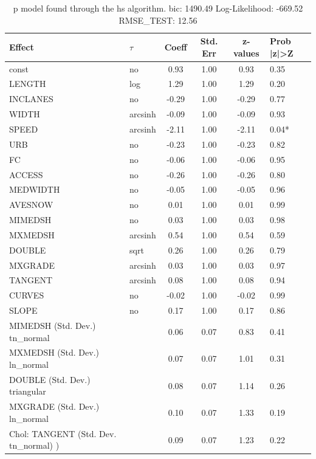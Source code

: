 \begin{table}
	\caption{p model found through the hs algorithm. bic: 1490.49 Log-Likelihood: -669.52 RMSE_TEST: 12.56}
	\begin{center}
		\begin{tabular}{|l|l|c|c|c|l|}
			\hline
			Effect & $\tau$ & Coeff & Std. Err & z-values & Prob |z|>Z \\
			\hline
			const & no & 0.93 & 1.00 & 0.93 & 0.35 \\
			\hline
			LENGTH & log & 1.29 & 1.00 & 1.29 & 0.20 \\
			\hline
			INCLANES & no & -0.29 & 1.00 & -0.29 & 0.77 \\
			\hline
			WIDTH & arcsinh & -0.09 & 1.00 & -0.09 & 0.93 \\
			\hline
			SPEED & arcsinh & -2.11 & 1.00 & -2.11 & 0.04* \\
			\hline
			URB & no & -0.23 & 1.00 & -0.23 & 0.82 \\
			\hline
			FC & no & -0.06 & 1.00 & -0.06 & 0.95 \\
			\hline
			ACCESS & no & -0.26 & 1.00 & -0.26 & 0.80 \\
			\hline
			MEDWIDTH & no & -0.05 & 1.00 & -0.05 & 0.96 \\
			\hline
			AVESNOW & no & 0.01 & 1.00 & 0.01 & 0.99 \\
			\hline
			MIMEDSH & no & 0.03 & 1.00 & 0.03 & 0.98 \\
			\hline
			MXMEDSH & arcsinh & 0.54 & 1.00 & 0.54 & 0.59 \\
			\hline
			DOUBLE & sqrt & 0.26 & 1.00 & 0.26 & 0.79 \\
			\hline
			MXGRADE & arcsinh & 0.03 & 1.00 & 0.03 & 0.97 \\
			\hline
			TANGENT & arcsinh & 0.08 & 1.00 & 0.08 & 0.94 \\
			\hline
			CURVES & no & -0.02 & 1.00 & -0.02 & 0.99 \\
			\hline
			SLOPE & no & 0.17 & 1.00 & 0.17 & 0.86 \\
			\hline
			MIMEDSH (Std. Dev.) tn_normal &  & 0.06 & 0.07 & 0.83 & 0.41 \\
			\hline
			MXMEDSH (Std. Dev.) ln_normal &  & 0.07 & 0.07 & 1.01 & 0.31 \\
			\hline
			DOUBLE (Std. Dev.) triangular &  & 0.08 & 0.07 & 1.14 & 0.26 \\
			\hline
			MXGRADE (Std. Dev.) ln_normal &  & 0.10 & 0.07 & 1.33 & 0.19 \\
			\hline
			 Chol: TANGENT (Std. Dev. tn_normal) ) &  & 0.09 & 0.07 & 1.23 & 0.22 \\

\end{tabular}
\end{center}
\end{table}
